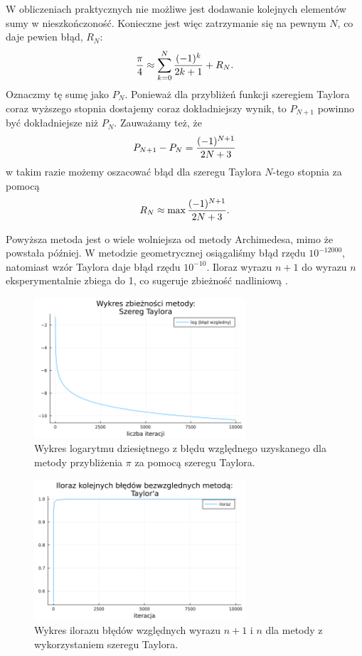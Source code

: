 W obliczeniach praktycznych nie możliwe jest dodawanie kolejnych elementów sumy w nieszkończoność. Konieczne jest więc zatrzymanie się na pewnym $N$, co daje pewien błąd, $R_N$:
$$\frac\pi4\approx \sum\limits_{k=0}^N{(-1)^k\over 2k+1}+R_N.$$
Oznaczmy tę sumę jako $P_N$. Ponieważ dla przybliżeń funkcji szeregiem Taylora coraz wyższego stopnia dostajemy coraz dokładniejszy wynik, to $P_{N+1}$ powinno być dokładniejsze niż $P_N$. Zauważamy też, że
$$P_{N+1}-P_N={(-1)^{N+1}\over 2N+3}$$
w takim razie możemy oszacować błąd dla szeregu Taylora $N$-tego stopnia za pomocą
$$R_N\approx \max{(-1)^{N+1}\over 2N+3}.$$

Powyższa metoda jest o wiele wolniejsza od metody Archimedesa, mimo że powstała później. W metodzie geometrycznej osiągaliśmy błąd rzędu $10^{-12000}$, natomiast wzór Taylora daje błąd rzędu $10^{-10}$. Iloraz wyrazu $n+1$ do wyrazu $n$ eksperymentalnie zbiega do 1, co sugeruje zbieżność nadliniową \cite{bog}.

\begin{figure}[!h]\centering
    \renewcommand{\figurename}{Wykres}
    \includegraphics[width=0.7\textwidth]{../prog/taylor_log_error.png}
    \caption{Wykres logarytmu dziesiętnego z błędu względnego uzyskanego dla metody przybliżenia $\pi$ za pomocą szeregu Taylora.}
    \label{taylor-series-error}
\end{figure}

\begin{figure}[!h]\centering
    \renewcommand{\figurename}{Wykres}
    \includegraphics[width=0.7\textwidth]{../prog/taylor_error_ratio.png}
    \caption{Wykres ilorazu błędów względnych wyrazu $n+1$ i $n$ dla metody z wykorzystaniem szeregu Taylora.}
    \label{taylor-series-convergence}
\end{figure}


